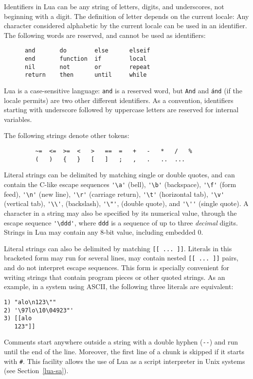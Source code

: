 \documentclass[11pt]{article}
\newcommand{\See}[1]{Section~\ref{#1}}
\newcommand{\see}[1]{(see \See{#1})}
\newcommand{\T}[1]{{\tt #1}}
\newcommand{\Index}[1]{#1\index{#1}}
\begin{document}
\Index{Identifiers} in Lua can be any string of letters,
digits, and underscores,
not beginning with a digit.
The definition of letter depends on the current locale:
Any character considered alphabetic by the current locale
can be used in an identifier.
The following words are reserved, and cannot be used as identifiers:
\begin{verbatim}
      and       do        else      elseif
      end       function  if        local
      nil       not       or        repeat
      return    then      until     while
\end{verbatim}
Lua is a case-sensitive language:
\T{and} is a reserved word, but \T{And} and \T{\'and}
(if the locale permits) are two other different identifiers.
As a convention, identifiers starting with underscore followed by
uppercase letters are reserved for internal variables.

The following strings denote other \Index{tokens}:
\begin{verbatim}
         ~=  <=  >=  <   >   ==  =   +   -   *   /   %
         (   )   {   }   [   ]   ;   ,   .   ..  ...
\end{verbatim}

\Index{Literal strings} can be delimited by matching single or double quotes,
and can contain the C-like escape sequences
\verb|'\a'| (bell),
\verb|'\b'| (backspace),
\verb|'\f'| (form feed),
\verb|'\n'| (new line),
\verb|'\r'| (carriage return),
\verb|'\t'| (horizontal tab),
\verb|'\v'| (vertical tab),
\verb|'\\'|, (backslash),
\verb|'\"'|, (double quote),
and \verb|'\''| (single quote).
A character in a string may also be specified by its numerical value,
through the escape sequence \verb|'\ddd'|,
where \verb|ddd| is a sequence of up to three \emph{decimal} digits.
Strings in Lua may contain any 8-bit value, including embedded 0.

Literal strings can also be delimited by matching \verb|[[ ... ]]|.
Literals in this bracketed form may run for several lines,
may contain nested \verb|[[ ... ]]| pairs,
and do not interpret escape sequences.
This form is specially convenient for
writing strings that contain program pieces or
other quoted strings.
As an example, in a system using ASCII,
the following three literals are equivalent:
\begin{verbatim}
1) "alo\n123\""
2) '\97lo\10\04923"'
3) [[alo
   123"]]
\end{verbatim}


\Index{Comments} start anywhere outside a string with a
double hyphen (\verb|--|) and run until the end of the line.
Moreover,
the first line of a chunk is skipped if it starts with \verb|#|.
This facility allows the use of Lua as a script interpreter
in Unix systems \see{lua-sa}.
\end{document}
